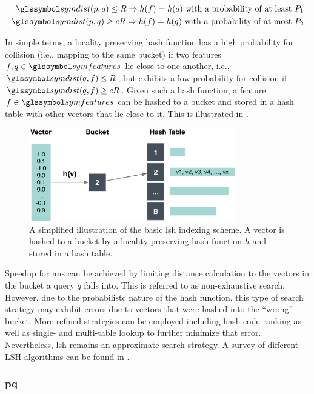 \begin{eqnarray}
    \symdist (p,q) \leq R \Rightarrow h(f) = h(q) \text{ with a probability of at least } P_1 \label{eq:lsh_1} \\
    \symdist (p,q) \geq cR \Rightarrow h(f) = h(q) \text{ with a probability of at most } P_2 \label{eq:lsh_2}
\end{eqnarray}

In simple terms, a locality preserving hash function has a high probability for collision (i.e., mapping to the same bucket) if two features $f,q \in \symfeatures$ lie close to one another, i.e., $\symdist(q,f) \leq R$, but exhibits a low probability for collision if $\symdist(q,f) \geq cR$. Given such a hash function, a feature $f \in \symfeatures$ can be hashed to a bucket and stored in a hash table with other vectors that lie close to it. This is illustrated in . 

\begin{figure}[tb]
    \centering
    \includegraphics[width=0.80\textwidth]{figures/lsh}
    \caption{A simplified illustration of the basic \acrshort{lsh} indexing scheme. A vector is hashed to a bucket by a locality preserving hash function $h$ and stored in a hash table.}
    \label{fig:lsh}
\end{figure}

Speedup for \acrshort{nns} can be achieved by limiting distance calculation to the vectors in the bucket a query $q$ falls into. This is referred to as non-exhaustive search. However, due to the probabilistc nature of the hash function, this type of search strategy may exhibit errors due to vectors that were hashed into the ``wrong'' bucket. More refined strategies can be employed including hash-code ranking as well as single- and multi-table lookup \cite{Wang:2017ASurvey} to further minimize that error. Nevertheless, \acrshort{lsh} remains an approximate search strategy. A survey of different LSH algorithms can be found in \cite{Wang:2017ASurvey}.

\subsubsection{\texorpdfstring{\acrfull{pq}}{Product Quantisation (PQ)}}
\label{section:index_pq}

